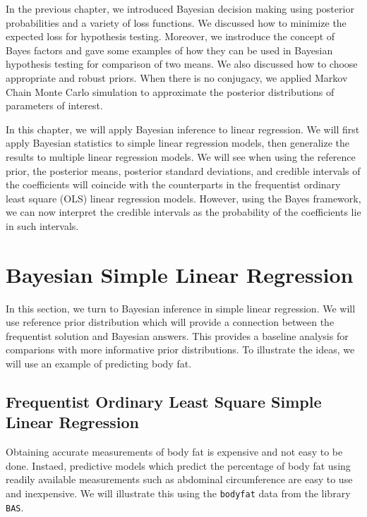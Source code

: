 \documentclass[]{book}
\theoremstyle{definition}
\theoremstyle{definition}
\theoremstyle{definition}
\theoremstyle{remark}
\begin{document}
In the previous chapter, we introduced Bayesian decision making using
posterior probabilities and a variety of loss functions. We discussed
how to minimize the expected loss for hypothesis testing. Moreover, we
instroduce the concept of Bayes factors and gave some examples of how
they can be used in Bayesian hypothesis testing for comparison of two
means. We also discussed how to choose appropriate and robust priors.
When there is no conjugacy, we applied Markov Chain Monte Carlo
simulation to approximate the posterior distributions of parameters of
interest.

In this chapter, we will apply Bayesian inference to linear regression.
We will first apply Bayesian statistics to simple linear regression
models, then generalize the results to multiple linear regression
models. We will see when using the reference prior, the posterior means,
posterior standard deviations, and credible intervals of the
coefficients will coincide with the counterparts in the frequentist
ordinary least square (OLS) linear regression models. However, using the
Bayes framework, we can now interpret the credible intervals as the
probability of the coefficients lie in such intervals.

\section{Bayesian Simple Linear
Regression}\label{bayesian-simple-linear-regression}

In this section, we turn to Bayesian inference in simple linear
regression. We will use reference prior distribution which will provide
a connection between the frequentist solution and Bayesian answers. This
provides a baseline analysis for comparions with more informative prior
distributions. To illustrate the ideas, we will use an example of
predicting body fat.

\subsection{Frequentist Ordinary Least Square Simple Linear
Regression}\label{frequentist-ordinary-least-square-simple-linear-regression}

Obtaining accurate measurements of body fat is expensive and not easy to
be done. Instaed, predictive models which predict the percentage of body
fat using readily available measurements such as abdominal circumference
are easy to use and inexpensive. We will illustrate this using the
\texttt{bodyfat} data from the library \texttt{BAS}.
\end{document}
